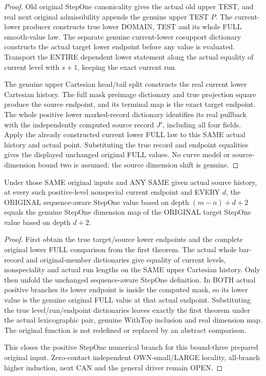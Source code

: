 \begin{proof}
Old original StepOne canonicality gives the actual old upper TEST, and
real next original admissibility appends the genuine upper TEST $P$.
The current-lower producer constructs true lower DOMAIN, TEST and its
whole FULL smooth-value law. The separate genuine current-lower cosupport
dictionary constructs the actual target lower endpoint before any value
is evaluated. Transport the ENTIRE dependent lower statement along the
actual equality of current level with $s+1$, keeping the exact current run.

The genuine upper Cartesian head/tail split constructs the real current
lower Cartesian history. The full mask preimage dictionary and true
projection square produce the source endpoint, and its terminal map is
the exact target endpoint. The whole positive lower marked-record
dictionary identifies its real pullback with the independently computed
source record $J'$, including all four fields. Apply the already constructed
current lower FULL law to this SAME actual history and actual point.
Substituting the true record and endpoint equalities gives the displayed
unchanged original FULL values. No curve model or source-dimension bound
two is assumed; the source dimension shift is genuine.
\end{proof}

\begin{theorem}
\label{hir:original-prepared-bound-three-positive-stepone-smooth-values}
\leanok
Under those SAME original inputs and ANY SAME given actual source history,
at every such positive-level nonspecial current endpoint and EVERY $d$,
the ORIGINAL sequence-aware StepOne value based on depth $(m-n)+d+2$
equals the genuine StepOne dimension map of the ORIGINAL target StepOne
value based on depth $d+2$.
\end{theorem}
\begin{proof}
First obtain the true target/source lower endpoints and the complete
original lower FULL comparison from the first theorem. The actual whole
bar-record and original-member dictionaries give equality of current
levels, nonspeciality and actual run lengths on the SAME upper Cartesian
history. Only then unfold the unchanged sequence-aware StepOne definition.
In BOTH actual positive branches its lower endpoint is inside the computed
mask, so its lower value is the genuine original FULL value at that actual
endpoint. Substituting the true level/run/endpoint dictionaries leaves
exactly the first theorem under the actual lexicographic pair, genuine
WithTop inclusion and real dimension map. The original function is not
redefined or replaced by an abstract comparison.

This closes the positive StepOne numerical branch for this bound-three
prepared original input. Zero-contact independent OWN-small/LARGE locality,
all-branch higher induction, next CAN and the general driver remain OPEN.
\end{proof}
